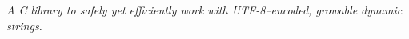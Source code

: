 \label{index_md_README}%
%
 {\itshape A C library to safely yet efficiently work with UTF-\/8–encoded, growable dynamic strings.}

